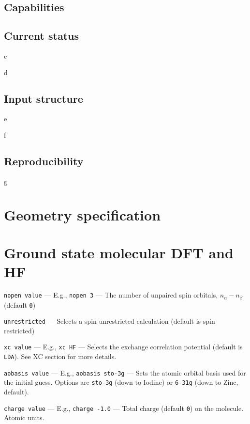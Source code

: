 \documentclass[letterpaper]{book}
\begin{document}
\section{Capabilities}



\section{Current status}

c

d

\section{Input structure}



e

f

\section{Reproducibility}

g

\chapter{Geometry specification}





\chapter{Ground state molecular DFT and HF}

{\tt nopen value} --- E.g., {\tt nopen 3} --- The number of unpaired spin orbitals, $n_\alpha - n_\beta$ (default {\tt 0})

{\tt unrestricted} --- Selects a spin-unrestricted calculation (default is spin restricted)

{\tt xc value} --- E.g., {\tt xc HF} --- Selects the exchange correlation potential (default is {\tt LDA}). See XC section for more details.

{\tt aobasis value} --- E.g., {\tt aobasis sto-3g} --- Sets the atomic orbital basis used for the initial guess.  Options are {\tt sto-3g} (down to Iodine)  or {\tt 6-31g} (down to Zinc, default).  

{\tt charge value} --- E.g., {\tt charge -1.0} --- Total charge (default {\tt 0}) on the molecule. Atomic units.
\end{document}
